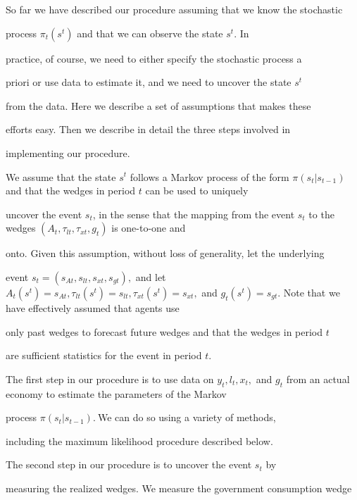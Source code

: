 \documentclass[fleqn,leqno,11pt]{article}
\begin{document}
So far we have described our procedure assuming that we know the stochastic

process $\pi _{t}(s^{t})$ and that we can observe the state $s^{t}.$ In

practice, of course, we need to either specify the stochastic process a

priori or use data to estimate it, and we need to uncover the state $s^{t}$

from the data. Here we describe a set of assumptions that makes these

efforts easy. Then we describe in detail the three steps involved in

implementing our procedure.



We assume that the state $s^{t}$ follows a Markov process of the form $\pi

(s_{t}|s_{t-1})$ and that the wedges in period $t$ can be used to uniquely

uncover the event $s_{t}$, in the sense that the mapping from the event $%

s_{t}$ to the wedges $(A_{t},\tau _{lt},\tau _{xt},g_{t})$ is one-to-one and

onto. Given this assumption, without loss of generality, let the underlying

event $s_{t}=(s_{At},s_{lt},s_{xt},s_{gt}),$ and let $A_{t}(s^{t})=s_{At},%

\tau _{lt}(s^{t})=s_{lt},\tau _{xt}(s^{t})=s_{xt},$ and $%

g_{t}(s^{t})=s_{gt}. $ Note that we have effectively assumed that agents use

only past wedges to forecast future wedges and that the wedges in period $t$

are sufficient statistics for the event in period $t.$



The first step in our procedure is to use data on $y_{t},l_{t},x_{t},$ and $%

g_{t}$ from an actual economy to estimate the parameters of the Markov

process $\pi (s_{t}|s_{t-1}).\ $We can do so using a variety of methods,

including the maximum likelihood procedure described below.



The second step in our procedure is to uncover the event $s_{t}$ by

measuring the realized wedges. We measure the government consumption wedge
\end{document}
